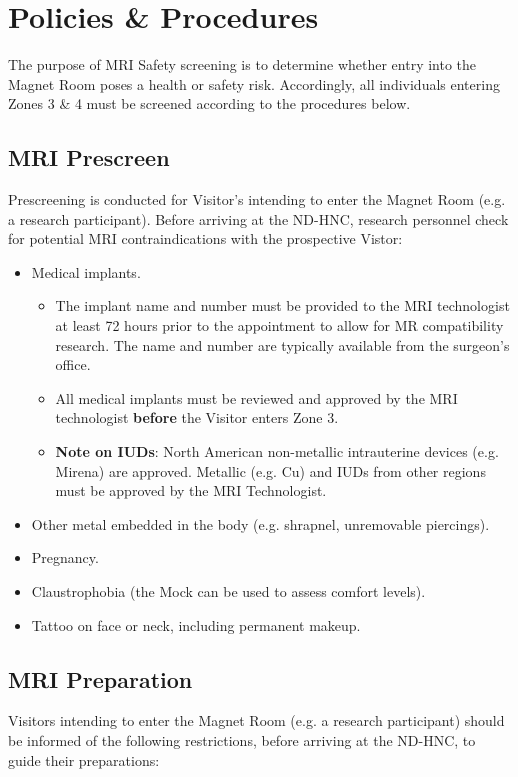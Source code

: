 \documentclass[11pt]{article}
\begin{document}
\section{Policies \& Procedures}

The purpose of MRI Safety screening is to determine whether entry into the Magnet Room poses a health or safety risk. Accordingly, all individuals entering Zones 3 \& 4 must be screened according to the procedures below.

%
\subsection{MRI Prescreen}
\label{ssec:mri-pre}
Prescreening is conducted for Visitor's intending to enter the Magnet Room (e.g. a research participant). Before arriving at the ND-HNC, research personnel check for potential MRI contraindications with the prospective Vistor:

\begin{itemize}
    \item Medical implants.
    \begin{itemize}
        \item The implant name and number must be provided to the MRI technologist at least 72 hours prior to the appointment to allow for MR compatibility research. The name and number are typically available from the surgeon's office.
        \item All medical implants must be reviewed and approved by the MRI technologist \textbf{before} the Visitor enters Zone 3.
        \item \textbf{Note on IUDs}: North American non-metallic intrauterine devices (e.g. Mirena) are approved. Metallic (e.g. Cu) and IUDs from other regions must be approved by the MRI Technologist.
    \end{itemize}
    \item Other metal embedded in the body (e.g. shrapnel, unremovable piercings).
    \item Pregnancy.
    \item Claustrophobia (the Mock can be used to assess comfort levels).
    \item Tattoo on face or neck, including permanent makeup.
\end{itemize}

%
\subsection{MRI Preparation}
\label{ssec:mri-prep}
Visitors intending to enter the Magnet Room (e.g. a research participant) should be informed of the following restrictions, before arriving at the ND-HNC, to guide their preparations:
\end{document}
